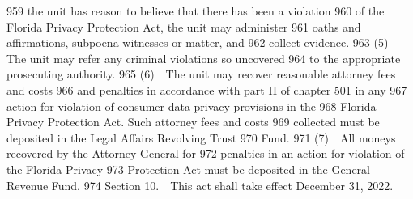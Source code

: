   959  the unit has reason to believe that there has been a violation
  960  of the Florida Privacy Protection Act, the unit may administer
  961  oaths and affirmations, subpoena witnesses or matter, and
  962  collect evidence.
  963         (5) The unit may refer any criminal violations so uncovered
  964  to the appropriate prosecuting authority.
  965         (6) The unit may recover reasonable attorney fees and costs
  966  and penalties in accordance with part II of chapter 501 in any
  967  action for violation of consumer data privacy provisions in the
  968  Florida Privacy Protection Act. Such attorney fees and costs
  969  collected must be deposited in the Legal Affairs Revolving Trust
  970  Fund.
  971         (7) All moneys recovered by the Attorney General for
  972  penalties in an action for violation of the Florida Privacy
  973  Protection Act must be deposited in the General Revenue Fund.
  974         Section 10. This act shall take effect December 31, 2022.
